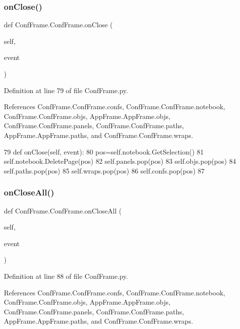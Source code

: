 \subsubsection{\texorpdfstring{on\+Close()}{onClose()}}
{\footnotesize\ttfamily def Conf\+Frame.\+Conf\+Frame.\+on\+Close (\begin{DoxyParamCaption}\item[{}]{self,  }\item[{}]{event }\end{DoxyParamCaption})}



Definition at line 79 of file Conf\+Frame.\+py.



References Conf\+Frame.\+Conf\+Frame.\+confs, Conf\+Frame.\+Conf\+Frame.\+notebook, Conf\+Frame.\+Conf\+Frame.\+objs, App\+Frame.\+App\+Frame.\+objs, Conf\+Frame.\+Conf\+Frame.\+panels, Conf\+Frame.\+Conf\+Frame.\+paths, App\+Frame.\+App\+Frame.\+paths, and Conf\+Frame.\+Conf\+Frame.\+wraps.


\begin{DoxyCode}
79     \textcolor{keyword}{def }onClose(self, event):
80         pos=self.notebook.GetSelection()
81         self.notebook.DeletePage(pos)
82         self.panels.pop(pos)
83         self.objs.pop(pos)
84         self.paths.pop(pos)
85         self.wraps.pop(pos)
86         self.confs.pop(pos)
87 
\end{DoxyCode}
\mbox{\label{classConfFrame_1_1ConfFrame_a6dea964103ba882eafed2c8735ab0a07}} 
\subsubsection{\texorpdfstring{on\+Close\+All()}{onCloseAll()}}
{\footnotesize\ttfamily def Conf\+Frame.\+Conf\+Frame.\+on\+Close\+All (\begin{DoxyParamCaption}\item[{}]{self,  }\item[{}]{event }\end{DoxyParamCaption})}



Definition at line 88 of file Conf\+Frame.\+py.



References Conf\+Frame.\+Conf\+Frame.\+confs, Conf\+Frame.\+Conf\+Frame.\+notebook, Conf\+Frame.\+Conf\+Frame.\+objs, App\+Frame.\+App\+Frame.\+objs, Conf\+Frame.\+Conf\+Frame.\+panels, Conf\+Frame.\+Conf\+Frame.\+paths, App\+Frame.\+App\+Frame.\+paths, and Conf\+Frame.\+Conf\+Frame.\+wraps.


